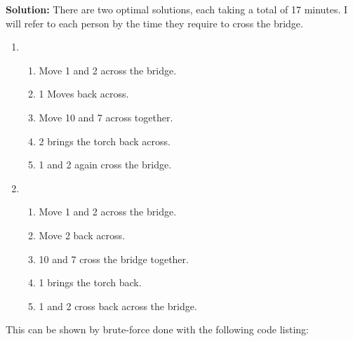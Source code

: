\documentclass{article}
\providecommand{\soln}{\textbf{Solution: }}
\begin{document}
    \soln There are two optimal solutions, each taking a total of 17 minutes. I will refer to each person by the time they require to cross the bridge.
    \begin{enumerate}
        \item \begin{enumerate}
            \item Move 1 and 2 across the bridge.
            \item 1 Moves back across.
            \item Move 10 and 7 across together.
            \item 2 brings the torch back across.
            \item 1 and 2 again cross the bridge.
        \end{enumerate}
        
        \item \begin{enumerate}
            \item Move 1 and 2 across the bridge.
            \item Move 2 back across.
            \item 10 and 7 cross the bridge together.
            \item 1 brings the torch back.
            \item 1 and 2 cross back across the bridge.
        \end{enumerate}
    \end{enumerate}
    
    This can be shown by brute-force done with the following code listing:
    
    
    
\end{document}
